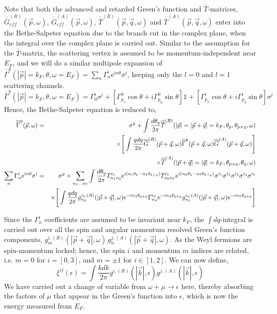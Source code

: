 \documentclass[letter,12pt,preprint,aps]{revtex4-1}
\newcommand{\be}{\begin{equation}}
\newcommand{\ee}{\end{equation}}
\newcommand{\ba}{\begin{eqnarray}}
\newcommand{\ea}{\end{eqnarray}}
\newcommand{\mI}{{\mathbb 1}}
\newcommand{\me}{\mathrm{e}}
\newcommand{\Gbar}{\overline{\overline{G}}}
\newcommand{\Tbar}{\overline{\overline{T}}}
\newcommand{\Gammabar}{\overline{\overline{\Gamma}}}
\begin{document}
Note that both the advanced and retarded Green's function and $\Tbar$-matrices, $\Gbar_{eff}^{(R)}(\vec{p}, \omega)$, $\Gbar_{eff}^{(A)}(\vec{p}, \omega)$, $\Tbar^{(R)}(\vec{p}, \vec{q}, \omega)$ and $\Tbar^{(A)}(\vec{p}, \vec{q}, \omega)$ enter into the Bethe-Salpeter equation due to the branch cut in the complex plane, when the integral over the complex plane is carried out. Similar to the assumption for the $\Tbar$-matrix, the scattering vertex is assumed to be momentum-independent near $E_F$, and we will do a similar multipole expansion of $\Gammabar^{y}(|\vec{p}| = k_F, \theta, \omega = E_F) = \sum_{n} \Gamma^i_n \me^{i n \theta} \sigma^i$, keeping only the $l = 0$ and $l = 1$ scattering channels. 
%
\be
\Gammabar^{y}(|\vec{p}| = k_F, \theta, \omega = E_F) =  \Gamma^i_0 \sigma^i + \left[ \Gamma^0_{p_x} \cos \theta + i \Gamma^0_{p_y} \sin \theta \right] \mI + \left[ \Gamma^i_{p_x} \cos \theta + i \Gamma^i_{p_y} \sin \theta \right] \sigma^i 
\ee
%
Hence, the Bethe-Salpeter equation is reduced to,
%
\ba
\Gammabar^{y}(\vec{p}, \omega) & = & \sigma^y + \int \frac{d \theta_q}{2 \pi} \Tbar^{(R)}(|\vec{p}| = |\vec{p} + \vec{q}| = k_F, \theta_p, \theta_{p + q}, \omega) \\
 & & \times \Bigg[ \int \frac{q dq}{2 \pi} \Gbar^{(R)}(\vec{p} + \vec{q}, \omega) \Gammabar^{y}(\vec{p} + \vec{q}, \omega) \Gbar^{(A)}(\vec{p} + \vec{q}, \omega) \Bigg] \cr
 & & \times \Tbar^{(A)}(|\vec{p} + \vec{q}| = |\vec{q}| = k_F, \theta_{p + q}, \theta_q, \omega) \cr
 \sum_{n} \Gamma^i_n \me^{i n \theta} \sigma^i & = & \sigma^y + \sum_{n_1 ... n_7} \int \frac{d \theta_q}{2 \pi} T^{i_1}_{n_1 n_2} \me^{i (n_1 \theta_k - n_2 \theta_{k+q})} T^{i_5}_{n_6 n_7} \me^{i (n_6 \theta_k - n_7 \theta_{k+q})} \sigma^{i_1} \sigma^{i_2} \sigma^{i_3} \sigma^{i_4} \sigma^{i_5}  \cr
 & & \times \Bigg[ \int \frac{q dq}{2 \pi} g_{n_3}^{i_2, (R)}(|\vec{p} + \vec{q}|, \omega) \me^{- i n_3 \theta_{p+q}}  \Gamma^{i_3}_{n_4} \me^{-i n_4 \theta_{p+q}}  g_{n_5}^{i_4, (A)}(|\vec{p} + \vec{q}|, \omega) \me^{- i n_5 \theta_{p+q}} \Bigg] \nonumber
\ea 

Since the $\Gamma^i_n$ coefficients are assumed to be invariant near $k_F$, the $\int dq$-integral is carried out over all the spin and angular momentum resolved Green's function components, $g_{m}^{i, (R)}(|\vec{p} + \vec{q}|, \omega) \, g_{n}^{j, (A)}(|\vec{p} + \vec{q}|, \omega)$. As the Weyl fermions are spin-momentum locked; hence, the spin $i$ and momentum $m$ indices are related, i.e. $m = 0$ for $i = [0,3]$, and $m = \pm 1$ for $i \in [1,2]$. We can now define, 
%
\be
\label{eqn: spectral weight integral}
\xi^{ij}(\epsilon) = \int \frac{k dk}{2 \pi} g^{i, (R)}(|\vec{k}|, \epsilon) g^{j, (A)}(|\vec{k}|, \epsilon)
\ee
%
We have carried out a change of variable from $\omega + \mu \rightarrow \epsilon$ here, thereby absorbing the factors of $\mu$ that appear in the Green's function into $\epsilon$, which is now the energy measured from $E_F$.
\end{document}
